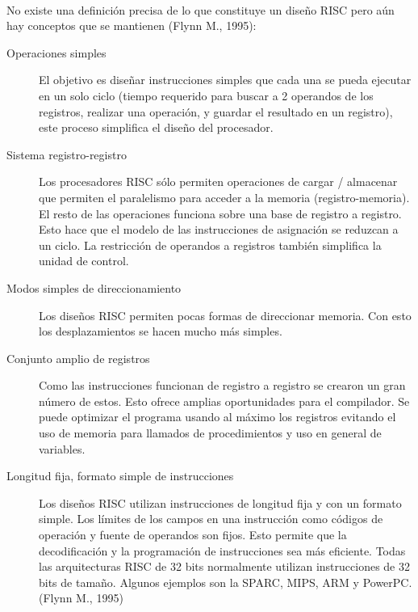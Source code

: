 \documentclass[10pt,a4paper]{article}
\begin{document}
\paragraph{}
No existe una definición precisa de lo que constituye un diseño RISC pero aún hay conceptos que se mantienen (Flynn M., 1995):
\begin{description}
  \item[Operaciones simples] El objetivo es diseñar instrucciones simples que cada una se pueda ejecutar en un solo ciclo (tiempo requerido para buscar a 2 operandos de los registros, realizar una operación, y guardar el resultado en un registro), este proceso simplifica el diseño del procesador. 
  \item[Sistema registro-registro] Los procesadores RISC sólo permiten operaciones de cargar / almacenar que permiten el paralelismo para acceder a la memoria (registro-memoria). El resto de las operaciones funciona sobre una base de registro a registro. Esto hace que el modelo de las instrucciones de asignación se reduzcan a un ciclo. La restricción de operandos a registros también simplifica la unidad de control.

  \item[Modos simples de direccionamiento] Los diseños RISC permiten pocas formas de direccionar memoria. Con esto los desplazamientos se hacen mucho más simples.

\item[Conjunto amplio de registros]
Como las instrucciones funcionan de registro a registro se crearon un gran número de estos. Esto ofrece amplias oportunidades para el compilador. Se puede optimizar el programa usando al máximo los registros evitando el uso de memoria para llamados de procedimientos y uso en general de variables.

\item[Longitud fija, formato simple de instrucciones] 
Los diseños RISC utilizan instrucciones de longitud fija y con un formato simple. Los límites de los campos en una instrucción como códigos de operación y fuente de operandos son fijos. Esto permite que la decodificación y la programación de instrucciones sea más eficiente. Todas las arquitecturas RISC de 32 bits normalmente  utilizan instrucciones de 32 bits de tamaño. Algunos ejemplos son la SPARC, MIPS, ARM y PowerPC. (Flynn M., 1995)
\end{description}
\end{document}
